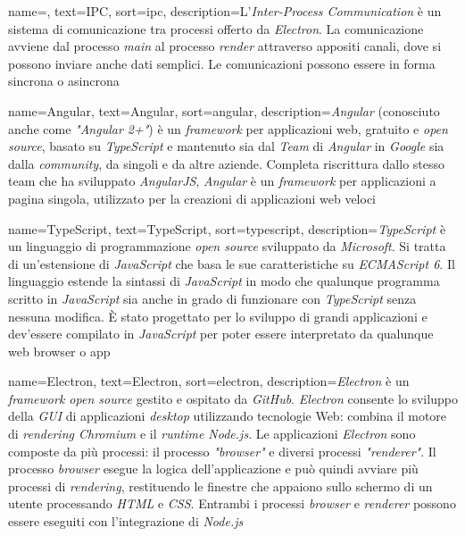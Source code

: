  {
    name=,
    text=IPC,
    sort=ipc,
    description={L'\emph{Inter-Process Communication} è un sistema di comunicazione tra processi offerto da \emph{Electron}. La comunicazione avviene dal processo \emph{main} al processo \emph{render} attraverso appositi canali, dove si possono inviare anche dati semplici. Le comunicazioni possono essere in forma sincrona o asincrona}
}

 {
    name=Angular,
    text=Angular,
    sort=angular,
    description={\emph{Angular} (conosciuto anche come \emph{"Angular 2+"}) è un \emph{framework} per applicazioni web, gratuito e \emph{open source}, basato su \emph{TypeScript} e mantenuto sia dal \emph{Team} di \emph{Angular} in \emph{Google} sia dalla \emph{community}, da singoli e da altre aziende. Completa riscrittura dallo stesso team che ha sviluppato \emph{AngularJS}, \emph{Angular} è un \emph{framework} per applicazioni a pagina singola, utilizzato per la creazioni di applicazioni web veloci}
}

 {
    name=TypeScript,
    text=TypeScript,
    sort=typescript,
    description={\emph{TypeScript} è un linguaggio di programmazione \emph{open source} sviluppato da \emph{Microsoft}. Si tratta di un'estensione di \emph{JavaScript} che basa le sue caratteristiche su \emph{ECMAScript 6}. Il linguaggio estende la sintassi di \emph{JavaScript} in modo che qualunque programma scritto in \emph{JavaScript} sia anche in grado di funzionare con \emph{TypeScript} senza nessuna modifica. È stato progettato per lo sviluppo di grandi applicazioni e dev'essere compilato in \emph{JavaScript} per poter essere interpretato da qualunque web browser o app}
}

 {
    name=Electron,
    text=Electron,
    sort=electron,
    description={\emph{Electron} è un \emph{framework open source} gestito e ospitato da \emph{GitHub}. \emph{Electron} consente lo sviluppo della \emph{GUI} di applicazioni \emph{desktop} utilizzando tecnologie Web: combina il motore di \emph{rendering Chromium} e il \emph{runtime Node.js}. Le applicazioni \emph{Electron} sono composte da più processi: il processo \emph{"browser"} e diversi processi \emph{"renderer"}. Il processo \emph{browser} esegue la logica dell'applicazione e può quindi avviare più processi di \emph{rendering}, restituendo le finestre che appaiono sullo schermo di un utente processando \emph{HTML} e \emph{CSS}. Entrambi i processi \emph{browser} e \emph{renderer} possono essere eseguiti con l'integrazione di \emph{Node.js}}
}

